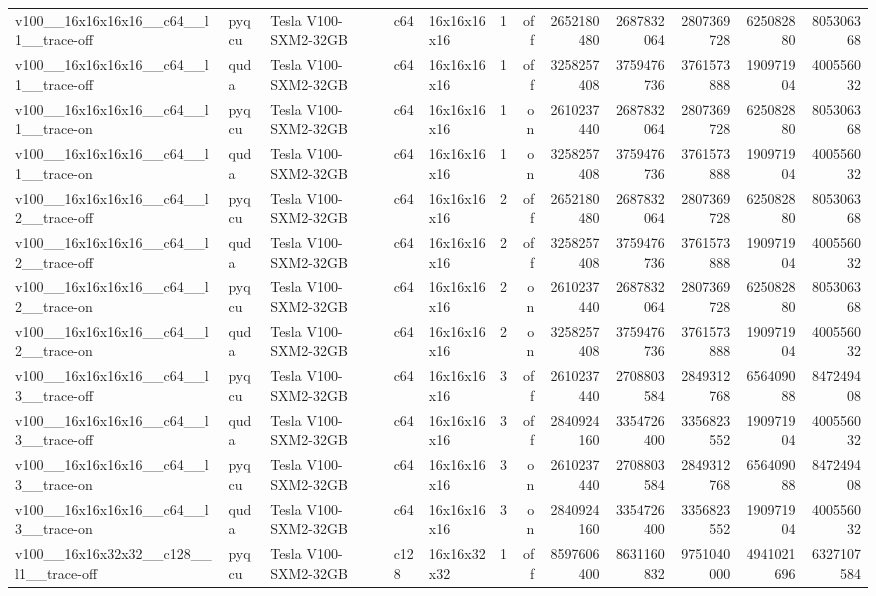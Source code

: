 \begin{table}[htbp]
\begin{tabular}{@{}lllllrrrrrrr@{}}
v100\_\_16x16x16x16\_\_c64\_\_l1\_\_trace-off & pyqcu & Tesla V100-SXM2-32GB & c64 & 16x16x16x16 & 1 & off & 2652180480 & 2687832064 & 2807369728 & 625082880 & 805306368 \\
v100\_\_16x16x16x16\_\_c64\_\_l1\_\_trace-off & quda & Tesla V100-SXM2-32GB & c64 & 16x16x16x16 & 1 & off & 3258257408 & 3759476736 & 3761573888 & 190971904 & 400556032 \\
v100\_\_16x16x16x16\_\_c64\_\_l1\_\_trace-on & pyqcu & Tesla V100-SXM2-32GB & c64 & 16x16x16x16 & 1 & on & 2610237440 & 2687832064 & 2807369728 & 625082880 & 805306368 \\
v100\_\_16x16x16x16\_\_c64\_\_l1\_\_trace-on & quda & Tesla V100-SXM2-32GB & c64 & 16x16x16x16 & 1 & on & 3258257408 & 3759476736 & 3761573888 & 190971904 & 400556032 \\
v100\_\_16x16x16x16\_\_c64\_\_l2\_\_trace-off & pyqcu & Tesla V100-SXM2-32GB & c64 & 16x16x16x16 & 2 & off & 2652180480 & 2687832064 & 2807369728 & 625082880 & 805306368 \\
v100\_\_16x16x16x16\_\_c64\_\_l2\_\_trace-off & quda & Tesla V100-SXM2-32GB & c64 & 16x16x16x16 & 2 & off & 3258257408 & 3759476736 & 3761573888 & 190971904 & 400556032 \\
v100\_\_16x16x16x16\_\_c64\_\_l2\_\_trace-on & pyqcu & Tesla V100-SXM2-32GB & c64 & 16x16x16x16 & 2 & on & 2610237440 & 2687832064 & 2807369728 & 625082880 & 805306368 \\
v100\_\_16x16x16x16\_\_c64\_\_l2\_\_trace-on & quda & Tesla V100-SXM2-32GB & c64 & 16x16x16x16 & 2 & on & 3258257408 & 3759476736 & 3761573888 & 190971904 & 400556032 \\
v100\_\_16x16x16x16\_\_c64\_\_l3\_\_trace-off & pyqcu & Tesla V100-SXM2-32GB & c64 & 16x16x16x16 & 3 & off & 2610237440 & 2708803584 & 2849312768 & 656409088 & 847249408 \\
v100\_\_16x16x16x16\_\_c64\_\_l3\_\_trace-off & quda & Tesla V100-SXM2-32GB & c64 & 16x16x16x16 & 3 & off & 2840924160 & 3354726400 & 3356823552 & 190971904 & 400556032 \\
v100\_\_16x16x16x16\_\_c64\_\_l3\_\_trace-on & pyqcu & Tesla V100-SXM2-32GB & c64 & 16x16x16x16 & 3 & on & 2610237440 & 2708803584 & 2849312768 & 656409088 & 847249408 \\
v100\_\_16x16x16x16\_\_c64\_\_l3\_\_trace-on & quda & Tesla V100-SXM2-32GB & c64 & 16x16x16x16 & 3 & on & 2840924160 & 3354726400 & 3356823552 & 190971904 & 400556032 \\
v100\_\_16x16x32x32\_\_c128\_\_l1\_\_trace-off & pyqcu & Tesla V100-SXM2-32GB & c128 & 16x16x32x32 & 1 & off & 8597606400 & 8631160832 & 9751040000 & 4941021696 & 6327107584 \\

\end{tabular}
\end{table}
